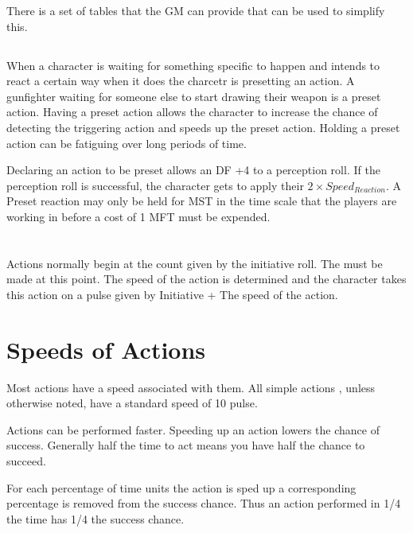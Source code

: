 There is a set of tables that the GM can provide that can be used to
simplify this. 

\subsection{}

When a character is waiting for something specific to happen and intends to react a certain 
way when it does the charcetr is presetting an action. A gunfighter waiting for someone else 
to start drawing their weapon is a preset action. Having a preset action allows the character to increase
the chance of detecting the triggering action and speeds up the preset action. 
Holding a preset action can be fatiguing over long periods of time.

Declaring an action to be preset allows an DF +4 to a perception roll. If the perception roll is successful, the 
character gets to apply their $ 2 \times Speed_{Reaction} $. A Preset reaction may only be held for MST 
in the time scale that the players are working in before a cost of 1 MFT must be expended.

\section{}

Actions normally begin at the count given by the initiative roll. The 
must be made at this point. The speed of the action is determined and 
the character takes this action on a pulse given by Initiative + The speed of the action.  

\section{Speeds of Actions}

Most actions have a speed associated with them. All simple actions
, unless otherwise noted, have a standard speed of 10 pulse. 




Actions can be performed faster. Speeding up an action lowers the
chance of success. Generally half the time to act means you have half the chance to succeed.

For each percentage of time units the action is sped up a corresponding percentage is removed from 
the success chance. Thus an action performed in 1/4 the time has 1/4 the success chance.

